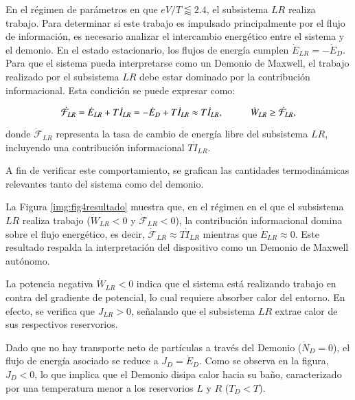 En el régimen de parámetros en que \( eV/T \lessapprox 2.4 \), el subsistema \( LR \) realiza trabajo. Para determinar si este trabajo es impulsado principalmente por el flujo de información, es necesario analizar el intercambio energético entre el sistema y el demonio. En el estado estacionario, los flujos de energía cumplen $\dot{E}_{LR}= -\dot{E}_{D}$. Para que el sistema pueda interpretarse como un Demonio de Maxwell, el trabajo realizado por el subsistema \( LR \) debe estar dominado por la contribución informacional. Esta condición se puede expresar como:

\[
\dot{\mathcal{F}}_{LR} = \dot{E}_{LR} + T\dot{I}_{LR} = -\dot{E}_{D} + T\dot{I}_{LR} \approx T\dot{I}_{LR}, \hspace{10mm} \dot{W}_{LR} \geq \dot{\mathcal{F}}_{LR},
\]

donde \( \dot{\mathcal{F}}_{LR} \) representa la tasa de cambio de energía libre del subsistema \( LR \), incluyendo una contribución informacional \( T\dot{I}_{LR} \).

A fin de verificar este comportamiento, se grafican las cantidades termodinámicas relevantes tanto del sistema como del demonio.



La Figura \ref{img:fig4resultado} muestra que, en el régimen en el que el subsistema $LR$ realiza trabajo ($\dot{W}_{LR} < 0$ y $\dot{\mathcal{F}}_{LR} < 0$), la contribución informacional domina sobre el flujo energético, es decir, $\dot{\mathcal{F}}_{LR} \approx T \dot{I}_{LR}$ mientras que $\dot{E}_{LR} \approx 0$. Este resultado respalda la interpretación del dispositivo como un Demonio de Maxwell autónomo.

La potencia negativa $\dot{W}_{LR} < 0$ indica que el sistema está realizando trabajo en contra del gradiente de potencial, lo cual requiere absorber calor del entorno. En efecto, se verifica que $J_{LR} > 0$, señalando que el subsistema $LR$ extrae calor de sus respectivos reservorios.

Dado que no hay transporte neto de partículas a través del Demonio ($\dot{N}_{D} = 0$), el flujo de energía asociado se reduce a $J_{D} = \dot{E}_{D}$. Como se observa en la figura, $J_{D} < 0$, lo que implica que el Demonio disipa calor hacia su baño, caracterizado por una temperatura menor a los reservorios $L$ y $R$ ($T_D < T$). 

